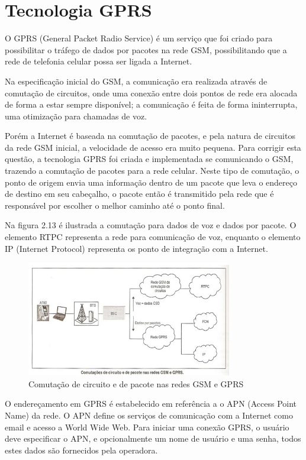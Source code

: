 \section {Tecnologia GPRS}

O GPRS (General Packet Radio Service) é um serviço que foi criado para possibilitar o tráfego de dados por pacotes na rede GSM, possibilitando que a rede de telefonia celular possa ser ligada a Internet.

Na especificação inicial do GSM, a comunicação era realizada através de comutação de circuitos, onde uma conexão entre dois pontos de rede era alocada de forma a estar sempre disponível; a comunicação é feita de forma ininterrupta, uma otimização para chamadas de voz.

Porém a Internet é baseada na comutação de pacotes, e pela natura de circuitos da rede GSM inicial, a velocidade de acesso era muito pequena. Para corrigir esta questão, a tecnologia GPRS foi criada e implementada se comunicando o GSM, trazendo a comutação de pacotes para a rede celular. Neste tipo de comutação, o ponto de origem envia uma informação dentro de um pacote que leva o endereço de destino em seu cabeçalho, o pacote então é transmitido pela rede que é responsável por escolher o melhor caminho até o ponto final.

Na figura 2.13 é ilustrada a comutação para dados de voz e dados por pacote. O elemento RTPC representa a rede para comunicação de voz, enquanto o elemento IP (Internet Protocol) representa os ponto de integração com a Internet.

\begin{figure}[h!]
			\centering
			\includegraphics[width=0.8\textwidth]{figures/gprs.jpg}
			\caption{Comutação de circuito e de pacote nas redes GSM e GPRS}
			\label{1}
\end{figure}

O endereçamento em GPRS é estabelecido em referência a o APN (Access Point Name) da rede. O APN define os serviços de comunicação com a Internet como email e acesso a World Wide Web. Para iniciar uma conexão GPRS, o usuário deve especificar o APN, e opcionalmente um nome de usuário e uma senha, todos estes dados são fornecidos pela operadora. 

